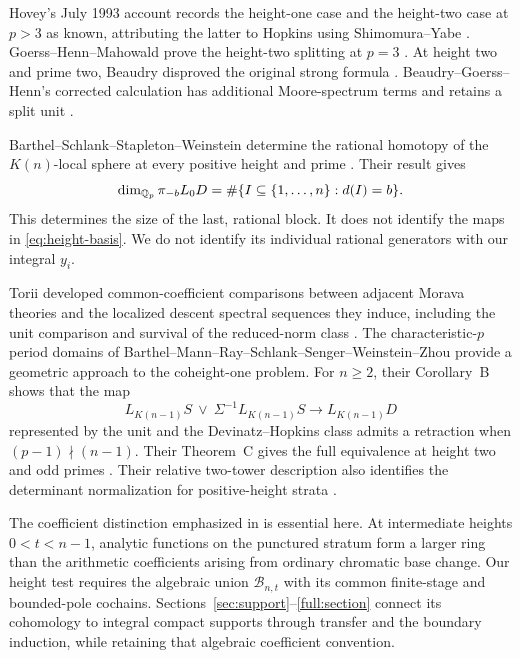 Hovey's July 1993 account records the height-one case and the
height-two case at \(p>3\) as known, attributing the latter to Hopkins using
Shimomura--Yabe \cite[pp.~17--19]{Hovey}. Goerss--Henn--Mahowald
prove the height-two splitting at \(p=3\)
\cite[Theorem~1.2]{GHM2014}. At height two and prime two, Beaudry
disproved the original strong formula
\cite[Theorem~1.4]{Beaudry2017}. Beaudry--Goerss--Henn's
corrected calculation has additional Moore-spectrum terms and retains
a split unit \cite[Theorem~1.1.6]{BGH2022}.

Barthel--Schlank--Stapleton--Weinstein determine the rational
homotopy of the \(K(n)\)-local sphere at every positive height and
prime \cite[Theorem~A]{BSSW}. Their result gives
\begin{equation}\label{eq:rational-dimensions}
 \dim_{\mathbb Q_p}\pi_{-b}L_0D
  =\#\{I\subseteq\{1,\ldots,n\}:d(I)=b\}.
\end{equation}
This determines the size of the last, rational block. It does not
identify the maps in \eqref{eq:height-basis}. We do not identify its
individual rational generators with our integral \(y_i\).

Torii developed common-coefficient comparisons between adjacent
Morava theories and the localized descent spectral sequences they
induce, including the unit comparison and survival of the reduced-norm
class \cite[Theorems~4.7, 6.2, 7.6, and~8.1]{ToriiTranschromatic}.
The characteristic-\(p\) period domains of
Barthel--Mann--Ray--Schlank--Senger--Weinstein--Zhou provide a geometric
approach to the coheight-one problem. For \(n\geq2\), their
Corollary~B shows that the map
\[
L_{K(n-1)}S\ \vee\ \Sigma^{-1}L_{K(n-1)}S
       \longrightarrow L_{K(n-1)}D
\]
represented by the unit and the Devinatz--Hopkins class admits a
retraction when \((p-1)\nmid(n-1)\). Their Theorem~C gives the
full equivalence at height two and odd primes \cite{BMR}.
Their relative two-tower description also identifies the determinant
normalization for positive-height strata
\cite[Theorems~2.0.1 and~2.6.3]{BMR}.

The coefficient distinction emphasized in \cite[Section~1.5]{BMR}
is essential here. At intermediate heights \(0<t<n-1\), analytic
functions on the punctured stratum form a larger ring than the
arithmetic coefficients arising from ordinary chromatic base change.
Our height test requires the algebraic union
\(\mathcal B_{n,t}\) with its common finite-stage and bounded-pole
cochains. Sections~\ref{sec:support}--\ref{full:section} connect its
cohomology to integral compact supports through transfer and the
boundary induction, while retaining that algebraic coefficient
convention.

